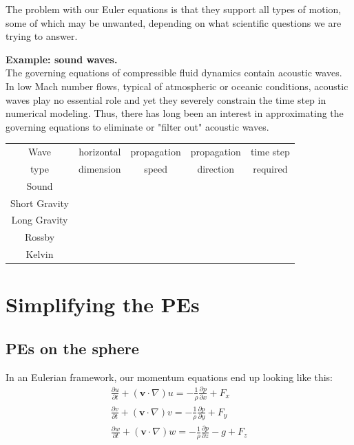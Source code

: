 The problem with our Euler equations is that they support all types of motion, some of which may be unwanted, depending on what scientific questions we are trying to answer. 

\medskip

{\bf Example: sound waves.}\\
The governing equations of compressible fluid dynamics contain acoustic waves. In low Mach number flows, typical of atmospheric or oceanic conditions, acoustic waves play no essential role and yet they severely constrain the time step in numerical modeling. Thus, there has long been an interest in approximating the governing equations to eliminate or "filter out" acoustic waves. 

\medskip

\begin{tabular}{|c|c|c|c|c|}
	\hline
	Wave & horizontal & propagation & propagation  & time step \\
	type & dimension & speed & direction & required \\
	\hline
	Sound &  &  &  & \\
	\hline
	Short Gravity &  &  &  & \\
	\hline
	Long Gravity &  &  &  & \\
	\hline
	Rossby &  &  & & \\
	\hline
	Kelvin &  &  &  & \\
	\hline
\end{tabular}

\section{Simplifying the PEs}
\subsection{PEs on the sphere}
In an Eulerian framework, our momentum equations end up looking like this:
\begin{eqnarray}
	\frac {\partial u}{\partial t} + \left(\mathbf{v}\cdot\nabla\right)u=-\frac{1}{\rho} \frac{\partial p}{\partial x}+F_x \\
	\frac {\partial v}{\partial t} + \left(\mathbf{v}\cdot\nabla\right)v=-\frac{1}{\rho} \frac{\partial p}{\partial y}+F_y \nonumber \\
	\frac {\partial w}{\partial t} + \left(\mathbf{v}\cdot\nabla\right)w=-\frac{1}{\rho} \frac{\partial p}{\partial z}-g+F_z \nonumber
\end{eqnarray}

